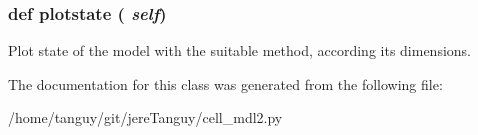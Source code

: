  \hypertarget{classcell__mdl2_1_1_tissue_model_aa124f33cab14b4466d10c00c8ec82875}{
\subsubsection[{plotstate}]{\setlength{\rightskip}{0pt plus 5cm}def plotstate ( {\em self})}}
\label{classcell__mdl2_1_1_tissue_model_aa124f33cab14b4466d10c00c8ec82875}
\begin{DoxyVerb}Plot state of the model with the suitable method, according its dimensions.\end{DoxyVerb}
 

The documentation for this class was generated from the following file:\begin{DoxyCompactItemize}
\item 
/home/tanguy/git/jereTanguy/cell\_\-mdl2.py\end{DoxyCompactItemize}
